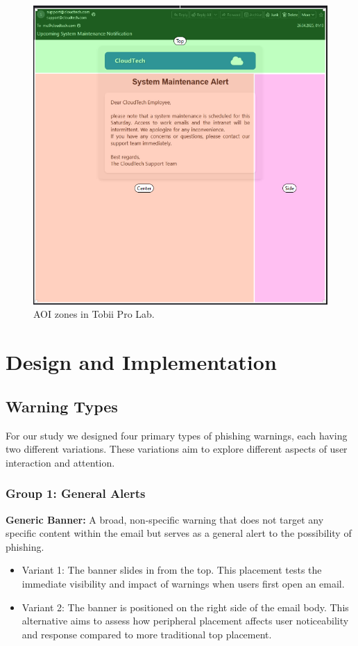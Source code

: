 \documentclass[
  a4paper,  %
  twoside,  %
  bibliography=totoc,
  headsepline,
  cleardoublepage=empty,
  parskip=half,
  draft=false
]{scrbook}
\begin{document}
\begin{figure} [ht]
    \centering
    \includegraphics[width=0.7\linewidth]{figures/aoi.png}
    \caption{AOI zones in Tobii Pro Lab.}
    \label{fig:aoi}
\end{figure}

\chapter{Design and Implementation}
\label{implementation}

\section{Warning Types}
\label{types}
For our study we designed four primary types of phishing warnings, each having two different variations. These variations aim to explore different aspects of user interaction and attention.

\subsection{Group 1: General Alerts}

\textbf{Generic Banner:} A broad, non-specific warning that does not target any specific content within the email but serves as a general alert to the possibility of phishing.

\begin{itemize}
    \item Variant 1: The banner slides in from the top. This placement tests the immediate visibility and impact of warnings when users first open an email. 
    \item Variant 2: The banner is positioned on the right side of the email body. This alternative aims to assess how peripheral placement affects user noticeability and response compared to more traditional top placement.\par
\end{itemize}
\end{document}

